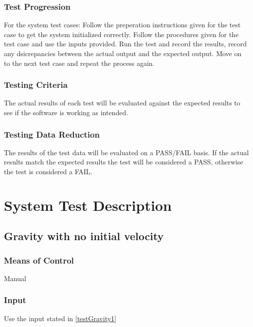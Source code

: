 \documentclass[12pt]{article}
\begin{document}
\subsubsection{Test Progression}

For the system test cases: Follow the preperation instructions given for the test case to get the system
initialized correctly. Follow the procedures given for the test case and use the inputs provided. Run the test and
record the results, record any dsicrepancies between the actual output and the expected output. Move on to the next
test case and repeat the process again.

\subsubsection{Testing Criteria}
The actual results of each test will be evaluated against the expected results to see if the software is working as 
intended.

\subsubsection{Testing Data Reduction}
The results of the test data will be evaluated on a PASS/FAIL basis. If the actual results match the expected
results the test will be considered a PASS, otherwise the test is considered a FAIL. 


%
%

\section{System Test Description}

\subsection{Gravity with no initial velocity}
\subsubsection{Means of Control}
Manual
\subsubsection{Input}
Use the input stated in \ref{testGravity1}
\end{document}
